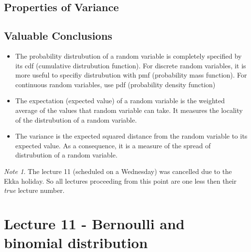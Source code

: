 \documentclass{report}
\theoremstyle{definition}
\theoremstyle{plain}
\newtheorem{theorem}{Theorem}
\theoremstyle{remark}
\newtheorem*{note}{Note}
\begin{document}
  \subsection{Properties of Variance}
  \begin{center}
  \end{center}

  \subsection{Valuable Conclusions}
  \begin{itemize}
    \item The probability distrubution of a random variable is completely
      specified by its cdf (cumulative distrubution function). For discrete
      random variables, it is more useful to specifiy distrubution with pmf
      (probability mass function). For continuous random variables, use pdf
      (probability density function)
    \item The expectation (expected value) of a random variable is the weighted
      average of the values that random variable can take. It measures the
      locality of the distrubution of a random variable.
    \item The variance is the expected squared distance from the random
      variable to its expected value. As a consequence, it is a measure of the
      spread of distrubution of a random variable.
  \end{itemize}
  \begin{note}
    The lecture 11 (scheduled on a Wednesday) was cancelled due to the Ekka
    holiday. So all lectures proceeding from this point are one less then their
    \textit{true} lecture number.
  \end{note}
  \newpage
  \section{Lecture 11 - Bernoulli and binomial distribution}
\end{document}
